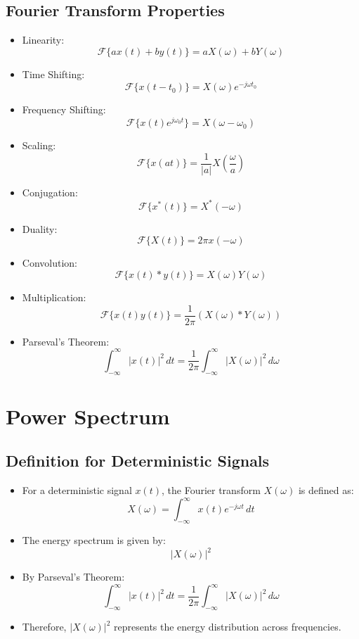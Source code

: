 \documentclass[12pt]{article}
\begin{document}
\subsection{Fourier Transform Properties}
\begin{itemize}
    \item Linearity:
    \[
    \mathcal{F}\{a x(t) + b y(t)\} = a X(\omega) + b Y(\omega)
    \]
    \item Time Shifting:
    \[
    \mathcal{F}\{x(t - t_0)\} = X(\omega) e^{-j\omega t_0}
    \]
    \item Frequency Shifting:
    \[
    \mathcal{F}\{x(t) e^{j\omega_0 t}\} = X(\omega - \omega_0)
    \]
    \item Scaling:
    \[
    \mathcal{F}\{x(at)\} = \frac{1}{|a|} X\left(\frac{\omega}{a}\right)
    \]
    \item Conjugation:
    \[
    \mathcal{F}\{x^*(t)\} = X^*(-\omega)
    \]
    \item Duality:
    \[
    \mathcal{F}\{X(t)\} = 2\pi x(-\omega)
    \]
    \item Convolution:
    \[
    \mathcal{F}\{x(t) * y(t)\} = X(\omega) Y(\omega)
    \]
    \item Multiplication:
    \[
    \mathcal{F}\{x(t) y(t)\} = \frac{1}{2\pi} \left( X(\omega) * Y(\omega) \right)
    \]
    \item Parseval’s Theorem:
    \[
    \int_{-\infty}^{\infty} |x(t)|^2 \, dt = \frac{1}{2\pi} \int_{-\infty}^{\infty} |X(\omega)|^2 \, d\omega
    \]
\end{itemize}

\section{Power Spectrum}

\subsection{Definition for Deterministic Signals}
\begin{itemize}
    \item For a deterministic signal \( x(t) \), the Fourier transform \( X(\omega) \) is defined as:
    \[
    X(\omega) = \int_{-\infty}^{\infty} x(t) e^{-j\omega t} \, dt
    \]
    \item The energy spectrum is given by:
    \[
    |X(\omega)|^2
    \]
    \item By Parseval’s Theorem:
    \[
    \int_{-\infty}^{\infty} |x(t)|^2 \, dt = \frac{1}{2\pi} \int_{-\infty}^{\infty} |X(\omega)|^2 \, d\omega
    \]
    \item Therefore, \( |X(\omega)|^2 \) represents the energy distribution across frequencies.
\end{itemize}
\end{document}
